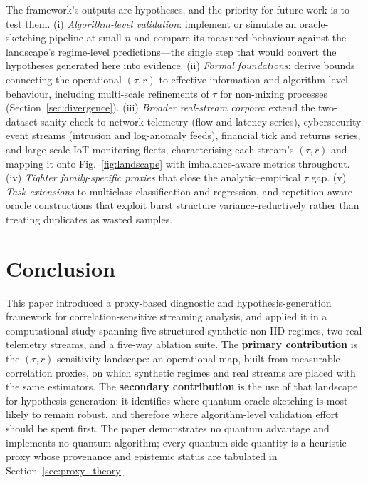 \documentclass[sensors,article,submit,pdftex,moreauthors]{Definitions/mdpi}
\begin{document}
The framework's outputs are hypotheses, and the priority for future work is to test them. (i) \emph{Algorithm-level validation}: implement or simulate an oracle-sketching pipeline at small $n$ and compare its measured behaviour against the landscape's regime-level predictions---the single step that would convert the hypotheses generated here into evidence. (ii) \emph{Formal foundations}: derive bounds connecting the operational $(\tau, r)$ to effective information and algorithm-level behaviour, including multi-scale refinements of $\tau$ for non-mixing processes (Section~\ref{sec:divergence}). (iii) \emph{Broader real-stream corpora}: extend the two-dataset sanity check to network telemetry (flow and latency series), cybersecurity event streams (intrusion and log-anomaly feeds), financial tick and returns series, and large-scale IoT monitoring fleets, characterising each stream's $(\tau, r)$ and mapping it onto Fig.~\ref{fig:landscape} with imbalance-aware metrics throughout. (iv) \emph{Tighter family-specific proxies} that close the analytic--empirical $\tau$ gap. (v) \emph{Task extensions} to multiclass classification and regression, and repetition-aware oracle constructions that exploit burst structure variance-reductively rather than treating duplicates as wasted samples.


\section{Conclusion}
\label{sec:conclusion}

This paper introduced a proxy-based diagnostic and hypothesis-generation framework for correlation-sensitive streaming analysis, and applied it in a computational study spanning five structured synthetic non\nobreakdash-IID regimes, two real telemetry streams, and a five-way ablation suite. The \textbf{primary contribution} is the $(\tau, r)$ sensitivity landscape: an operational map, built from measurable correlation proxies, on which synthetic regimes and real streams are placed with the same estimators. The \textbf{secondary contribution} is the use of that landscape for hypothesis generation: it identifies where quantum oracle sketching is most likely to remain robust, and therefore where algorithm-level validation effort should be spent first. The paper demonstrates no quantum advantage and implements no quantum algorithm; every quantum-side quantity is a heuristic proxy whose provenance and epistemic status are tabulated in Section~\ref{sec:proxy_theory}.
\end{document}
